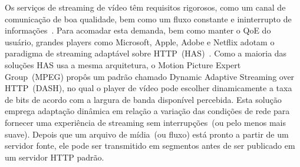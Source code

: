 

Os serviços de streaming de vídeo têm requisitos rigorosos, como um canal de comunicação de boa qualidade, bem como um fluxo constante e ininterrupto de informações~\cite{Immich2018WinNet}.
Para acomadar esta demanda, bem como manter o QoE do usuário, grandes players como Microsoft, Apple, Adobe e Netflix adotam o paradigma de streaming adaptável sobre HTTP~(HAS)~\cite{company:dashs}. Como a maioria das soluções HAS usa a mesma arquitetura, o Motion Picture Expert Group~(MPEG) propôs um padrão chamado Dynamic Adaptive Streaming over HTTP~(DASH), no qual o player de vídeo pode escolher dinamicamente a taxa de bits de acordo com a largura de banda disponível percebida.
Esta solução emprega adaptação dinâmica em relação a variação das condições de rede para fornecer uma experiência de streaming sem interrupções~(ou pelo menos mais suave). Depois que um arquivo de mídia~(ou fluxo) está pronto a partir de um servidor fonte, ele pode ser transmitido em segmentos antes de ser publicado em um servidor HTTP padrão.

